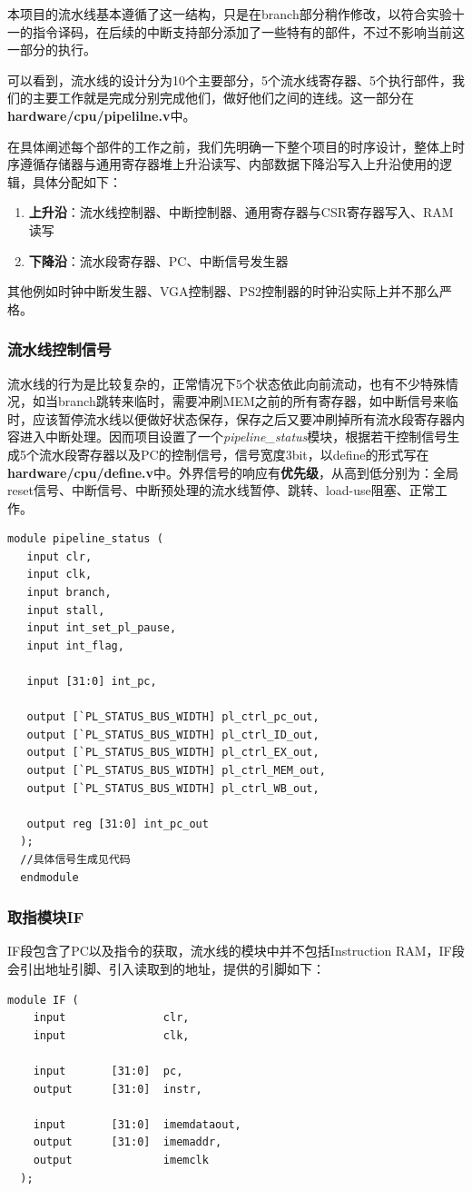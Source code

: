 \documentclass[]{article}
\begin{document}
  本项目的流水线基本遵循了这一结构，只是在branch部分稍作修改，以符合实验十一的指令译码，在后续的中断支持部分添加了一些特有的部件，不过不影响当前这一部分的执行。
  
  可以看到，流水线的设计分为10个主要部分，5个流水线寄存器、5个执行部件，我们的主要工作就是完成分别完成他们，做好他们之间的连线。这一部分在\textbf{hardware/cpu/pipelilne.v}中。
  
  在具体阐述每个部件的工作之前，我们先明确一下整个项目的时序设计，整体上时序遵循存储器与通用寄存器堆上升沿读写、内部数据下降沿写入上升沿使用的逻辑，具体分配如下：
  \begin{enumerate}
      \item \textbf{上升沿}：流水线控制器、中断控制器、通用寄存器与CSR寄存器写入、RAM读写
      \item \textbf{下降沿}：流水段寄存器、PC、中断信号发生器
  \end{enumerate}
  其他例如时钟中断发生器、VGA控制器、PS2控制器的时钟沿实际上并不那么严格。
  \subsubsection{流水线控制信号}
  流水线的行为是比较复杂的，正常情况下5个状态依此向前流动，也有不少特殊情况，如当branch跳转来临时，需要冲刷MEM之前的所有寄存器，如中断信号来临时，应该暂停流水线以便做好状态保存，保存之后又要冲刷掉所有流水段寄存器内容进入中断处理。因而项目设置了一个\textit{pipeline\_status}模块，根据若干控制信号生成5个流水段寄存器以及PC的控制信号，信号宽度3bit，以define的形式写在\textbf{hardware/cpu/define.v}中。外界信号的响应有\textbf{优先级}，从高到低分别为：全局reset信号、中断信号、中断预处理的流水线暂停、跳转、load-use阻塞、正常工作。
  
  \begin{lstlisting}[style={verilog-style}]
  module pipeline_status (
   input clr,
   input clk,
   input branch,
   input stall,
   input int_set_pl_pause,
   input int_flag,

   input [31:0] int_pc,

   output [`PL_STATUS_BUS_WIDTH] pl_ctrl_pc_out,
   output [`PL_STATUS_BUS_WIDTH] pl_ctrl_ID_out,
   output [`PL_STATUS_BUS_WIDTH] pl_ctrl_EX_out,
   output [`PL_STATUS_BUS_WIDTH] pl_ctrl_MEM_out,
   output [`PL_STATUS_BUS_WIDTH] pl_ctrl_WB_out,

   output reg [31:0] int_pc_out
  );
  //具体信号生成见代码
  endmodule
  \end{lstlisting}
  \subsubsection{取指模块IF}
  IF段包含了PC以及指令的获取，流水线的模块中并不包括Instruction RAM，IF段会引出地址引脚、引入读取到的地址，提供的引脚如下：
  \begin{lstlisting}[style={verilog-style}]
  module IF (
    input               clr,
    input               clk,
    
    input       [31:0]  pc,
    output      [31:0]  instr,

    input       [31:0]  imemdataout,
    output      [31:0]  imemaddr,
    output              imemclk
  );

  \end{lstlisting}
  
\end{document}
